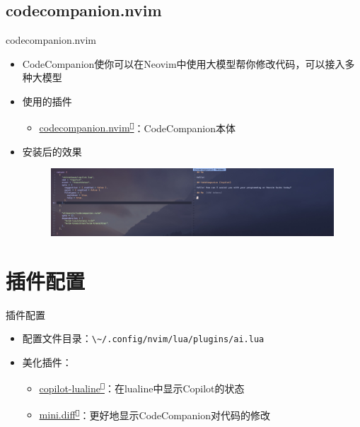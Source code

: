\documentclass[aspectratio=169]{ctexbeamer}
\newcommand{\nerd}[1]{\texttt{#1}}
\newcommand{\link}[3][]{\href{#3}{#2\textsuperscript{\nerd{}}}}
\begin{document}
  \subsection{codecompanion.nvim}
    \begin{frame}{codecompanion.nvim}
      \begin{itemize}
        \item CodeCompanion使你可以在Neovim中使用大模型帮你修改代码，可以接入多种大模型
        \item 使用的插件
          \begin{itemize}
            \item \link{codecompanion.nvim}{https://github.com/olimorris/codecompanion.nvim}：CodeCompanion本体
          \end{itemize}
        \item 安装后的效果
          \begin{figure}[H]
            \centering
            \includegraphics[width=\linewidth]{./Figures/CodeCompanion_Instal_Result.jpg}
          \end{figure}
      \end{itemize}
    \end{frame}

\section{插件配置}
  \begin{frame}{插件配置}
    \begin{itemize}
      \item 配置文件目录：\lstinline[language={}, style=path]{\~/.config/nvim/lua/plugins/ai.lua}

      \item 美化插件：
        \begin{itemize}
          \item \link{copilot-lualine}{https://github.com/AndreM222/copilot-lualine}：在lualine中显示Copilot的状态
          \item \link{mini.diff}{https://github.com/echasnovski/mini.diff}：更好地显示CodeCompanion对代码的修改 %
        \end{itemize}
    \end{itemize}
  \end{frame}
\end{document}
